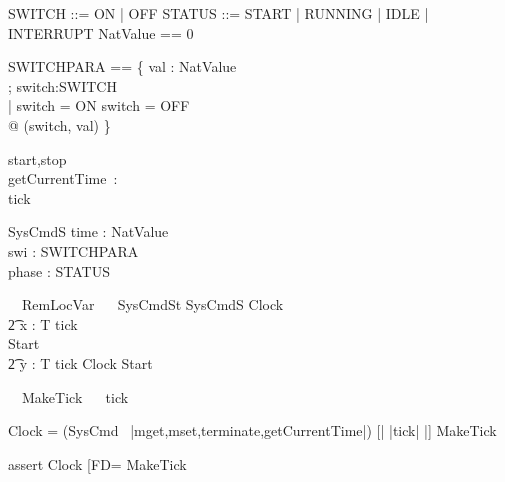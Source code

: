 \begin{zed}
SWITCH ::= ON | OFF
\also STATUS ::= START | RUNNING | IDLE | INTERRUPT
\also NatValue == 0 
\end{zed}
\begin{zed}
SWITCHPARA == \{ val  : NatValue\\; switch:SWITCH  \\
   | switch = ON \lor switch = OFF \\
   @ (switch, val) \}\\
\end{zed}
\begin{circus}
  \circchannel start,stop\\
  \circchannel getCurrentTime~:~\nat\\
  \circchannel tick
\end{circus}

\begin{schema}{SysCmdS}
 time : NatValue\\
 swi : SWITCHPARA\\
 phase : \power STATUS
\end{schema}
\begin{circus}%
  \circprocess\ ~RemLocVar ~\circdef~\circbegin
  \circstate SysCmdSt  SysCmdS
  Clock ~\circdef~
  \\\t2 \circvar x : T \circspot tick \then \Skip\\
  Start ~\circdef~ 
  \\\t2 \circvar y : T \circspot tick \then Clock
  \circspot Start
  \circend
\end{circus}
\begin{circus}
\circprocess\ ~MakeTick ~\circdef~\circbegin
\circspot tick \then \Skip
\circend
\end{circus}


Clock = 
  (SysCmd \ {|mget,mset,terminate,getCurrentTime|}) 
  [| {|tick|} |] MakeTick 

assert Clock [FD= MakeTick